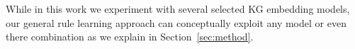 
While in this work we experiment with several selected KG embedding models, our general rule learning approach can conceptually exploit any model or even there combination as we explain in Section~\ref{sec:method}. %




